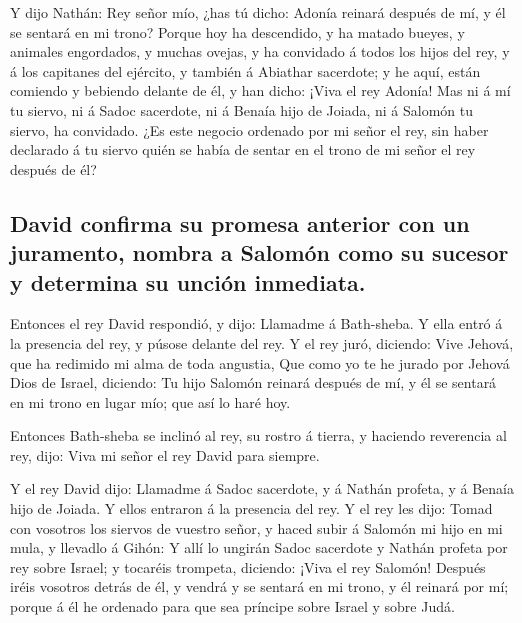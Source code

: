 Y dijo Nathán: Rey señor mío, ¿has tú dicho: Adonía
reinará después de mí, y él se sentará en mi trono?  Porque
hoy ha descendido, y ha matado bueyes, y animales engordados, y muchas
ovejas, y ha convidado á todos los hijos del rey, y á los capitanes del
ejército, y también á Abiathar sacerdote; y he aquí, están comiendo y
bebiendo delante de él, y han dicho: ¡Viva el rey Adonía! 
Mas ni á mí tu siervo, ni á Sadoc sacerdote, ni á Benaía hijo de Joiada,
ni á Salomón tu siervo, ha convidado.  ¿Es este negocio
ordenado por mi señor el rey, sin haber declarado á tu siervo quién se
había de sentar en el trono de mi señor el rey después de él?

\hypertarget{david-confirma-su-promesa-anterior-con-un-juramento-nombra-a-salomuxf3n-como-su-sucesor-y-determina-su-unciuxf3n-inmediata.}{%
\subsection{David confirma su promesa anterior con un juramento, nombra
a Salomón como su sucesor y determina su unción
inmediata.}\label{david-confirma-su-promesa-anterior-con-un-juramento-nombra-a-salomuxf3n-como-su-sucesor-y-determina-su-unciuxf3n-inmediata.}}

 Entonces el rey David respondió, y dijo: Llamadme á
Bath-sheba. Y ella entró á la presencia del rey, y púsose delante del
rey.  Y el rey juró, diciendo: Vive Jehová, que ha redimido
mi alma de toda angustia,  Que como yo te he jurado por
Jehová Dios de Israel, diciendo: Tu hijo Salomón reinará después de mí,
y él se sentará en mi trono en lugar mío; que así lo haré hoy.

 Entonces Bath-sheba se inclinó al rey, su rostro á tierra,
y haciendo reverencia al rey, dijo: Viva mi señor el rey David para
siempre.

 Y el rey David dijo: Llamadme á Sadoc sacerdote, y á
Nathán profeta, y á Benaía hijo de Joiada. Y ellos entraron á la
presencia del rey.  Y el rey les dijo: Tomad con vosotros
los siervos de vuestro señor, y haced subir á Salomón mi hijo en mi
mula, y llevadlo á Gihón:  Y allí lo ungirán Sadoc
sacerdote y Nathán profeta por rey sobre Israel; y tocaréis trompeta,
diciendo: ¡Viva el rey Salomón!  Después iréis vosotros
detrás de él, y vendrá y se sentará en mi trono, y él reinará por mí;
porque á él he ordenado para que sea príncipe sobre Israel y sobre Judá.

